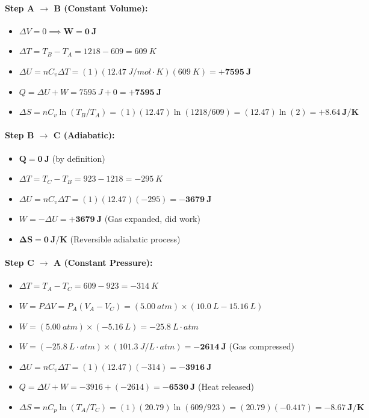 \documentclass[article]{article}
\begin{document}
\paragraph{Step A $\to$ B (Constant Volume):}
\begin{itemize}
    \item $\Delta V = 0 \implies \mathbf{W = \SI{0}{J}}$
    \item $\Delta T = T_B - T_A = 1218 - 609 = \SI{609}{K}$
    \item $\Delta U = nC_v\Delta T = (1)(\SI{12.47}{J/mol\cdot K})(\SI{609}{K}) = \mathbf{+\SI{7595}{J}}$
    \item $Q = \Delta U + W = \SI{7595}{J} + 0 = \mathbf{+\SI{7595}{J}}$
    \item $\Delta S = nC_v \ln(T_B / T_A) = (1)(12.47) \ln(1218 / 609) = (12.47) \ln(2) = \mathbf{+\SI{8.64}{J/K}}$
\end{itemize}

\paragraph{Step B $\to$ C (Adiabatic):}
\begin{itemize}
    \item $\mathbf{Q = \SI{0}{J}}$ (by definition)
    \item $\Delta T = T_C - T_B = 923 - 1218 = \SI{-295}{K}$
    \item $\Delta U = nC_v\Delta T = (1)(12.47)(-295) = \mathbf{-\SI{3679}{J}}$
    \item $W = -\Delta U = \mathbf{+\SI{3679}{J}}$ (Gas expanded, did work)
    \item $\mathbf{\Delta S = \SI{0}{J/K}}$ (Reversible adiabatic process)
\end{itemize}

\paragraph{Step C $\to$ A (Constant Pressure):}
\begin{itemize}
    \item $\Delta T = T_A - T_C = 609 - 923 = \SI{-314}{K}$
    \item $W = P\Delta V = P_A (V_A - V_C) = (\SI{5.00}{atm}) \times (\SI{10.0}{L} - \SI{15.16}{L})$
    \item $W = (\SI{5.00}{atm}) \times (\SI{-5.16}{L}) = \SI{-25.8}{L\cdot atm}$
    \item $W = (\SI{-25.8}{L\cdot atm}) \times (\SI{101.3}{J/L\cdot atm}) = \mathbf{-\SI{2614}{J}}$ (Gas compressed)
    \item $\Delta U = nC_v\Delta T = (1)(12.47)(-314) = \mathbf{-\SI{3916}{J}}$
    \item $Q = \Delta U + W = -3916 + (-2614) = \mathbf{-\SI{6530}{J}}$ (Heat released)
    \item $\Delta S = nC_p \ln(T_A / T_C) = (1)(20.79) \ln(609 / 923) = (20.79)(-0.417) = \mathbf{-\SI{8.67}{J/K}}$
\end{itemize}
\end{document}
